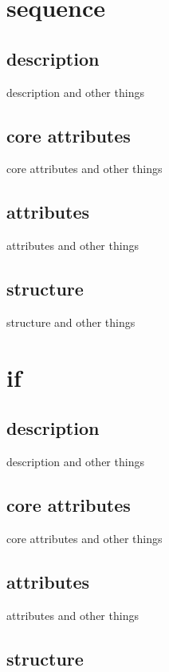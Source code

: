 \section{sequence}

    \subsection{description}

description and other things

    \subsection{core attributes}

core attributes and other things

    \subsection{attributes}

attributes and other things

    \subsection{structure}

structure and other things




\section{if}

\subsection{description}

        description and other things

    \subsection{core attributes}

core attributes and other things

    \subsection{attributes}

attributes and other things

    \subsection{structure}

